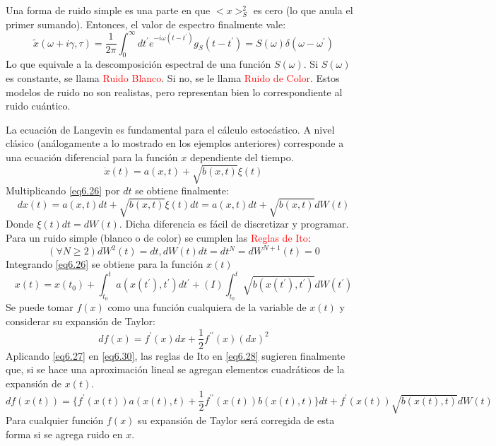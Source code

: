 \documentclass{book}
\begin{document}
Una forma de ruido simple es una parte en que $<x>_S^2$ es cero (lo que anula el primer sumando). Entonces, el valor de espectro finalmente vale:
\begin{equation}\label{eq6.25}\tilde{x}(\omega+i\gamma,\tau)=\frac{1}{2\pi}\int_0^\infty dt^\prime e^{-i\omega(t-t^\prime)}g_S(t-t^\prime)=S(\omega)\delta(\omega-\omega^\prime)\end{equation}
Lo que equivale a la descomposición espectral de una función $S(\omega)$. Si $S(\omega)$ es constante, se llama \textcolor{red}{Ruido Blanco}. Si no, se le llama \textcolor{red}{Ruido de Color}. Estos modelos de ruido no son realistas, pero representan bien lo correspondiente al ruido cuántico.

La ecuación de Langevin es fundamental para el cálculo estocástico. A nivel clásico (análogamente a lo mostrado en los ejemplos anteriores) corresponde a una ecuación diferencial para la función $x$ dependiente del tiempo.
\begin{equation}\label{eq6.26}\dot{x}(t)=a(x,t)+\sqrt{b(x,t)}\xi(t)\end{equation}
Multiplicando \ref{eq6.26} por $dt$ se obtiene finalmente:
\begin{equation}\label{eq6.27}dx(t)=a(x,t)dt+\sqrt{b(x,t)}\xi(t)dt=a(x,t)dt+\sqrt{b(x,t)}dW(t)\end{equation}
Donde $\xi(t)dt=dW(t)$. Dicha diferencia es fácil de discretizar y programar. Para un ruido simple (blanco o de color) se cumplen las \textcolor{red}{Reglas de Ito}:
\begin{equation}\label{eq6.28}(\forall N\geq 2)dW^2(t)=dt, dW(t)dt=dt^N=dW^{N+1}(t)=0 \end{equation}
Integrando \ref{eq6.26} se obtiene para la función $x(t)$
\begin{equation}\label{eq6.29}x(t)=x(t_0)+\int_{t_0}^t a(x(t^\prime),t^\prime) dt^\prime +(I)\int_{t_0}^t \sqrt{b(x(t^\prime),t^\prime)}dW(t^\prime)\end{equation}
Se puede tomar $f(x)$ como una función cualquiera de la variable de $x(t)$ y considerar su expansión de Taylor:
\begin{equation}\label{eq6.30}df(x)=f^\prime(x)dx+\frac{1}{2}f^{\prime\prime}(x)(dx)^2\end{equation}
Aplicando \ref{eq6.27} en \ref{eq6.30}, las reglas de Ito en \ref{eq6.28} sugieren finalmente que, si se hace una aproximación lineal se agregan elementos cuadráticos de la expansión de $x(t)$.
\begin{equation}\label{eq6.31}df(x(t))=\{f^\prime(x(t))a(x(t),t)+\frac{1}{2}f^{\prime\prime}(x(t))b(x(t),t)\}dt+f^\prime(x(t))\sqrt{b(x(t),t)}
dW(t)\end{equation}
Para cualquier función $f(x)$ su expansión de Taylor será corregida de esta forma si se agrega ruido en $x$.
\end{document}
